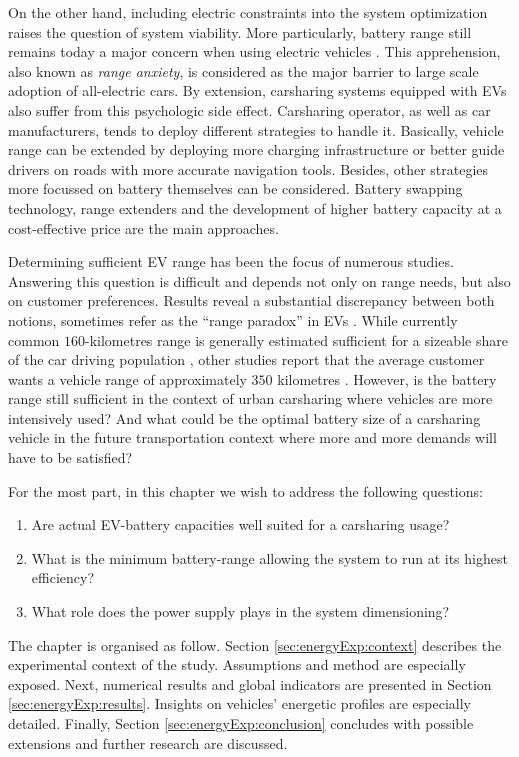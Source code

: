 On the other hand, including electric constraints into the system optimization raises the question of system viability.
More particularly, battery range still remains today a major concern when using electric vehicles \cite{franke_experiencing_2012}.
This apprehension, also known as \emph{range anxiety}, is considered as the major barrier to large scale adoption of all-electric cars.
By extension, carsharing systems equipped with EVs also suffer from this psychologic side effect.
Carsharing operator, as well as car manufacturers, tends to deploy different strategies to handle it.
Basically, vehicle range can be extended by deploying more charging infrastructure or better guide drivers on roads with more accurate navigation tools.
Besides, other strategies more focussed on battery themselves can be considered.
Battery swapping technology, range extenders and the development of higher battery capacity at a cost-effective price are the main approaches.

\medskip
Determining sufficient EV range has been the focus of numerous studies.
Answering this question is difficult and depends not only on range needs, but also on customer preferences.
Results reveal a substantial discrepancy between both notions, sometimes refer as the ``range paradox'' in EVs \cite{franke_what_2013}.
While currently common $160$-kilometres range is generally estimated sufficient for a sizeable share of the car driving population \cite{pearre_electric_2011, chlond_market_2012}, other studies report that the average customer wants a vehicle range of approximately $350$ kilometres \cite{bunzeck_preferences_2011}.
However, is the battery range still sufficient in the context of urban carsharing where vehicles are more intensively used?
And what could be the optimal battery size of a carsharing vehicle in the future transportation context where more and more demands will have to be satisfied?

\medskip
For the most part, in this chapter we wish to address the following questions:
\begin{enumerate}
\item Are actual EV-battery capacities well suited for a carsharing usage?
\item What is the minimum battery-range allowing the system to run at its highest efficiency?
\item What role does the power supply plays in the system dimensioning?
\end{enumerate}
The chapter is organised as follow.
Section \ref{sec:energyExp:context} describes the experimental context of the study.
Assumptions and method are especially exposed.
Next, numerical results and global indicators are presented in Section \ref{sec:energyExp:results}.
Insights on vehicles' energetic profiles are especially detailed.
Finally, Section \ref{sec:energyExp:conclusion} concludes with possible extensions and further research are discussed.


